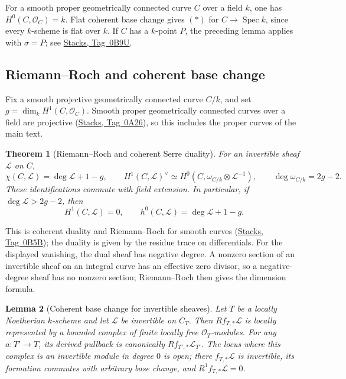 \documentclass[11pt,a4paper]{article}
\numberwithin{equation}{section}
\newtheorem{theorem}{Theorem}[section]
\newtheorem{lemma}[theorem]{Lemma}
\theoremstyle{definition}
\theoremstyle{remark}
\newcommand{\stacks}[1]{\href{https://stacks.math.columbia.edu/tag/#1}{\textnormal{Stacks, Tag~#1}}}
\begin{document}
For a smooth proper geometrically connected curve $C$ over a field
$k$, one has $H^0(C,\mathcal O_C)=k$. Flat coherent base change gives
$(\ast)$ for $C\to\operatorname{Spec}k$, since every $k$-scheme is
flat over $k$. If $C$ has a $k$-point $P$, the preceding lemma applies
with $\sigma=P$; see \stacks{0B9U}.

\subsection{Riemann--Roch and coherent base change}
\label{app:picard-coherent-tools}

Fix a smooth projective geometrically connected curve $C/k$, and set
$g=\dim_kH^1(C,\mathcal O_C)$. Smooth proper geometrically connected
curves over a field are projective (\stacks{0A26}), so this includes
the proper curves of the main text.

\begin{theorem}[Riemann--Roch and coherent Serre duality]
\label{app:picard-riemann-roch}
For an invertible sheaf $\mathcal L$ on $C$,
\[
 \chi(C,\mathcal L)=\deg\mathcal L+1-g,
 \qquad
 H^1(C,\mathcal L)^\vee
     \simeq H^0(C,\omega_{C/k}\otimes\mathcal L^{-1}),
 \qquad \deg\omega_{C/k}=2g-2.
\]
These identifications commute with field extension. In particular, if
$\deg\mathcal L>2g-2$, then
\[
 H^1(C,\mathcal L)=0,
 \qquad h^0(C,\mathcal L)=\deg\mathcal L+1-g.
\]
\end{theorem}

This is coherent duality and Riemann--Roch for smooth curves
(\stacks{0B5B}); the duality is given by the residue trace on
differentials. For the displayed
vanishing, the dual sheaf has negative degree. A nonzero section of an
invertible sheaf on an integral curve has an effective zero divisor,
so a negative-degree sheaf has no nonzero section; Riemann--Roch then
gives the dimension formula.

\begin{lemma}[Coherent base change for invertible sheaves]
\label{app:picard-coherent-base-change}
Let $T$ be a locally Noetherian $k$-scheme and let $\mathcal L$ be
invertible on $C_T$. Then $Rf_{T,*}\mathcal L$ is locally represented
by a bounded complex of finite locally free $\mathcal O_T$-modules.
For any $a:T'\to T$, its derived pullback is canonically
$Rf_{T',*}\mathcal L_{T'}$. The locus where this complex is an
invertible module in degree $0$ is open; there $f_{T,*}\mathcal L$ is
invertible, its formation commutes with arbitrary base change, and
$R^1f_{T,*}\mathcal L=0$.
\end{lemma}
\end{document}
